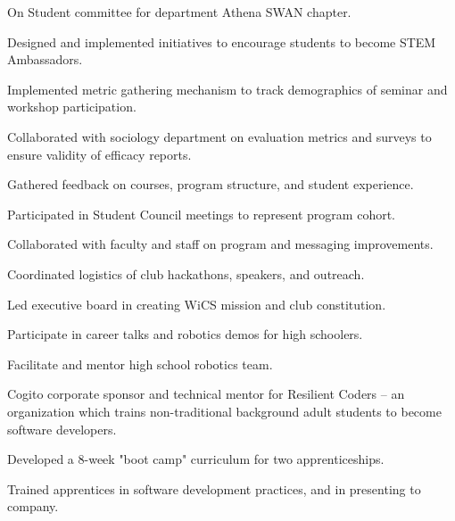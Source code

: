\documentclass[]{csaund_resume-openfont}
\begin{document}
\begin{tightemize}
\item On Student committee for department Athena SWAN chapter.
\item Designed and implemented initiatives to encourage students to become STEM Ambassadors.
\item Implemented metric gathering mechanism to track demographics of seminar and workshop participation.
\item Collaborated with sociology department on evaluation metrics and surveys to ensure validity of efficacy reports.\end{tightemize}
\sectionsep

\begin{tightemize}
\item Gathered feedback on courses, program structure, and student experience.
\item Participated in Student Council meetings to represent program cohort.
\item Collaborated with faculty and staff on program and messaging improvements.
\end{tightemize}
\sectionsep

\begin{tightemize}
\item Coordinated logistics of club hackathons, speakers, and outreach.
\item Led executive board in creating WiCS mission and club constitution.
\end{tightemize}
\sectionsep

\begin{tightemize}
\item Participate in career talks and robotics demos for high schoolers.
\item Facilitate and mentor high school robotics team.
\end{tightemize}
\sectionsep

\begin{tightemize}
\item Cogito corporate sponsor and technical mentor for Resilient Coders -- an organization which trains non-traditional background adult students to become software developers.
\item Developed a 8-week "boot camp" curriculum for two apprenticeships.
\item Trained apprentices in software development practices, and in presenting to company.
\end{tightemize}
\sectionsep
\end{document}
